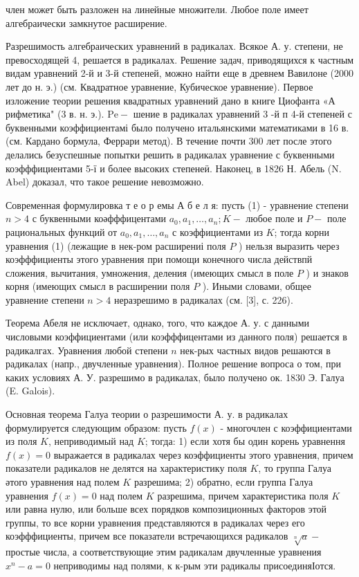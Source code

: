 \documentclass[10pt]{article}
\begin{document}
член может быть разложен на линейные множители. Любое поле имеет алгебраически замкнутое расширение.



Разрешимость алгебраических уравнений в радикалах. Всякое А. у. степени, не превосходящей 4, решается в радикалах. Решение задач, приводящихся к частным видам уравнений 2-й и 3-й степеней, можно найти еще в древнем Вавилоне (2000 лет до н. э.) (см. Квадратное уравнение, Кубическое уравнение). Первое изложение теории решения квадратных уравнений дано в книге Циофанта «А рифметика" (3 в. н. э.). $\mathrm{Pe}-$ шение в радикалах уравнений 3 -й п 4-й степеней с буквенными коэффициентамі было получено итальянскими математиками в 16 в. (см. Кардано бормула, Феррари метод). В течение почти 300 лет после этого делались безуспешные попытки решить в радикалах уравнение с буквенными коэфффициентами 5-ї и более высоких степенеӥ. Наконец, в 1826 Н. Абель (N. Abel) доказал, что такое решение невозможно.



Современная формулировка т е о р емы А б е л я: пусть (1) - уравнение степени $n>4$ с буквенными коәфффицентами $a_{0}, a_{1}, \ldots, a_{n} ; K-$ любое поле и $P-$ поле рациональных функций от $a_{0}, a_{1}, \ldots, a_{n}$ с коэффициентами из $K$; тогда корни уравнения (1) (лежащие в нек-ром расширениі поля $P$ ) нельзя выразить через коэфффициенты этого уравнения при помощи конечного числа действпй сложения, вычитания, умножения, деления (имеющих смысл в поле $P$ ) и знаков корня (имеющих смысл в расширении поля $P$ ). Иными словами, общее уравнение степени $n>4$ неразрешимо в радикалах (см. [3], с. 226).



Теорема Абеля не исключает, однако, того, что каждое А. у. с данными числовыми коэффициентами (или коэфффицентами из данного поля) решается в радикалгах. Уравнения любой степени $n$ нек-рых частных видов решаются в радикалах (напр., двучленные уравнения). Полное решение вопроса о том, при каких условиях А. У. разрешимо в радикалах, было получено ок. 1830 Э. Галуа (E. Galois).



Основная теорема Галуа теории о разрешимости А. у. в радикалах формулируется следующим образом: пусть $f(x)$ - многочлен с коэффициентами из поля $K$, неприводимый над $K$; тогда: 1) если хотя бы один корень уравнення $f(x)=0$ выражается в радикалах через коэффициенты этого уравнения, причем показатели радикалов не делятся на характеристику поля $K$, то группа Галуа әтого уравнения над полем $K$ разрешима; 2) обратно, если группа Галуа уравнения $f(x)=0$ над полем $K$ разрешима, причем характеристика поля $K$ или равна нулю, или больше всех порядков композиционных факторов этой группы, то все корни уравнения представляются в радикалах через его коэфффициенты, причем все показатели встречающихся радикалов $\sqrt[n]{a}-$ простые числа, а соответствующие этим радикалам двучленные уравнения $x^{n}-a=0$ неприводимы над полями, к к-рым эти радикалы присоединяІотся.
\end{document}
